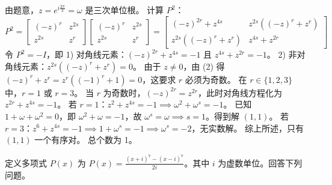 \begin{questions}
\begin{solution}
由题意，$z = e^{i \frac{2\pi}{3}} = \omega$ 是三次单位根。
计算 $P^2$：
\[
P^2 = \begin{bmatrix} (-z)^r & z^{2s} \\ z^{2s} & z^r \end{bmatrix} \begin{bmatrix} (-z)^r & z^{2s} \\ z^{2s} & z^r \end{bmatrix} = \begin{bmatrix} (-z)^{2r} + z^{4s} & z^{2s}((-z)^r + z^r) \\ z^{2s}((-z)^r + z^r) & z^{4s} + z^{2r} \end{bmatrix}
\]
令 $P^2 = -I$，即
1) 对角线元素：$(-z)^{2r} + z^{4s} = -1$ 且 $z^{4s} + z^{2r} = -1$。
2) 非对角线元素：$z^{2s}((-z)^r + z^r) = 0$。
由于 $z \neq 0$，由 (2) 得 $(-z)^r + z^r = z^r((-1)^r + 1) = 0$，这要求 $r$ 必须为奇数。
在 $r \in \{1, 2, 3\}$ 中，$r = 1$ 或 $r = 3$。
当 $r$ 为奇数时，$(-z)^{2r} = z^{2r}$，此时对角线方程化为 $z^{2r} + z^{4s} = -1$。
若 $r = 1$：$z^2 + z^{4s} = -1 \implies \omega^2 + \omega^s = -1$。
已知 $1 + \omega + \omega^2 = 0$，即 $\omega^2 + \omega = -1$，故 $\omega^s = \omega \implies s = 1$。得到解 $(1, 1)$。
若 $r = 3$：$z^6 + z^{4s} = -1 \implies 1 + \omega^s = -1 \implies \omega^s = -2$，无实数解。
综上所述，只有 $(1, 1)$ 一个有序对。
总个数为 1。
\end{solution}

    \question
定义多项式 $P(x)$ 为 $P(x) = \frac{(x+i)^7 - (x-i)^7}{2i}$。其中 $i$ 为虚数单位。回答下列问题。
\end{questions}

